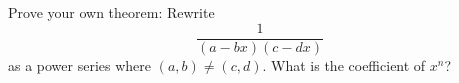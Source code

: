 Prove your own theorem:
Rewrite
\[
\frac{1}{(a - bx)(c - dx)}
\]
as a power series where $(a,b) \neq (c,d)$.
What is the coefficient of $x^n$?

